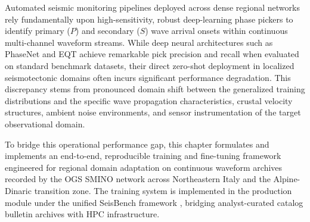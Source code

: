 
\label{chap:training}

Automated seismic monitoring pipelines deployed across dense regional
networks rely fundamentally upon high-sensitivity, robust deep-learning
phase pickers to identify primary ($P$) and secondary ($S$) wave arrival
onsets within continuous multi-channel waveform streams. While deep neural
architectures such as \ac{PhaseNet} and \acf{EQT} achieve
remarkable pick precision and recall when evaluated on standard
benchmark datasets, their
direct zero-shot deployment in localized seismotectonic domains often
incurs significant performance degradation. This discrepancy stems from
pronounced domain shift between the generalized training distributions and
the specific wave propagation characteristics, crustal velocity structures,
ambient noise environments, and sensor instrumentation of the target
observational domain.

To bridge this operational performance gap, this chapter formulates and
implements an end-to-end, reproducible training and fine-tuning framework
engineered for regional domain adaptation on continuous waveform archives
recorded by the \ac{OGS} \ac{SMINO} network across
Northeastern Italy and the Alpine-Dinaric transition zone. The training
system is implemented in the production module 
under the unified SeisBench framework \parencite{SeisBench}, bridging
analyst-curated catalog bulletin archives with \ac{HPC} infrastructure.


